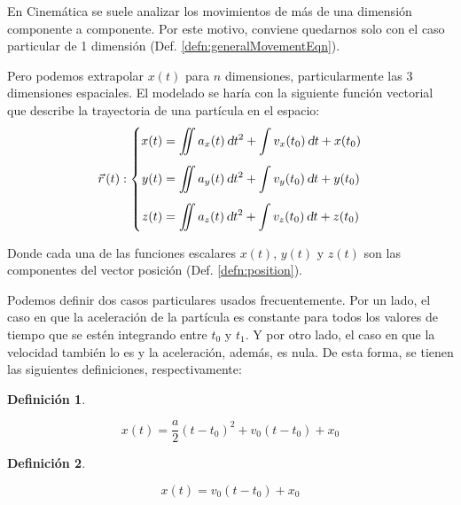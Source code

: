 \documentclass[a5paper,12pt,twoside]{book}
\newtheorem{defn}{{Definición}}[chapter]
\begin{document}
En Cinemática se suele analizar los movimientos de más de una dimensión componente a componente.
Por este motivo, conviene quedarnos solo con el caso particular de 1 dimensión (Def. \ref{defn:generalMovementEqn}).

Pero podemos extrapolar $x(t)$ para $n$ dimensiones, particularmente las 3 dimensiones espaciales.
El modelado se haría con la siguiente función vectorial que describe la trayectoria de una partícula en el espacio:
\[
  \vec{r}\hspace{0.05cm}(t) :
  \left\{
    \begin{aligned}
      x(t) &= \displaystyle\iint a_x(t) \, \textsl{d} t^2 + \displaystyle\int v_x(t_0) \, \textsl{d} t + x(t_0)
      \\[1ex]
      y(t) &= \displaystyle\iint a_y(t) \, \textsl{d} t^2 + \displaystyle\int v_y(t_0) \, \textsl{d} t + y(t_0)
      \\[1ex]
      z(t) &= \displaystyle\iint a_z(t) \, \textsl{d} t^2 + \displaystyle\int v_z(t_0) \, \textsl{d} t + z(t_0)
    \end{aligned}
  \right.
\]

Donde cada una de las funciones escalares $x(t)$, $y(t)$ y $z(t)$ son las componentes del vector posición (Def. \ref{defn:position}).

Podemos definir dos casos particulares usados frecuentemente.
Por un lado, el caso en que la aceleración de la partícula es constante para todos los valores de tiempo que se estén integrando entre $t_0$ y $t_1$.
Y por otro lado, el caso en que la velocidad también lo es y la aceleración, además, es nula.
De esta forma, se tienen las siguientes definiciones, respectivamente:

\begin{mdframed}[style=MyFrame1]
    \begin{defn}
        \label{defn:cstAccelMovementEqn}
    \end{defn}
    \begin{equation*}
        x(t) = \dfrac{a}{2}(t-t_0)^2 + v_0(t-t_0) + x_0
    \end{equation*}
\end{mdframed}

\begin{mdframed}[style=MyFrame1]
    \begin{defn}
        \label{defn:cstVelMovementEqn}
    \end{defn}
    \begin{equation*}
        x(t) = v_0(t-t_0) + x_0
    \end{equation*}
\end{mdframed}
\end{document}
